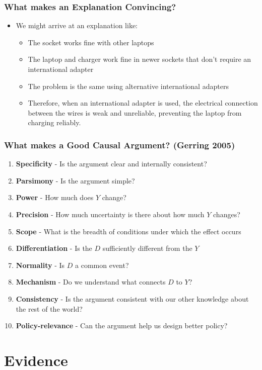 \documentclass[xcolor=x11names,compress]{beamer}\usepackage[]{graphicx}\usepackage[]{xcolor}
\renewcommand{\(}{\begin{columns}}
\renewcommand{\)}{\end{columns}}
\newcommand{\<}[1]{\begin{column}{#1}}
\renewcommand{\>}{\end{column}}
\begin{document}
\begin{frame}
\frametitle{What makes an Explanation Convincing?}
\begin{itemize}
\item We might arrive at an explanation like:
\begin{itemize}
\item The socket works fine with other laptops
\item The laptop and charger work fine in newer sockets that don't require an international adapter
\item The problem is the same using alternative international adapters
\item Therefore, when an international adapter is used, the electrical connection between the wires is weak and unreliable, preventing the laptop from charging reliably. 
\end{itemize}
\end{itemize}
\end{frame}

\begin{frame}
\frametitle{What makes a Good Causal Argument? (Gerring 2005)}
\begin{enumerate}
\item \textbf{Specificity} - Is the argument clear and internally consistent?
\pause
\item \textbf{Parsimony} - Is the argument simple?
\pause
\item \textbf{Power} - How much does $Y$ change?
\pause
\item \textbf{Precision} - How much uncertainty is there about how much $Y$ changes?
\pause
\item \textbf{Scope} - What is the breadth of conditions under which the effect occurs
\pause
\item \textbf{Differentiation} - Is the $D$ sufficiently different from the $Y$
\pause
\item \textbf{Normality} - Is $D$ a common event?
\pause
\item \textbf{Mechanism} - Do we understand what connects $D$ to $Y$?
\pause
\item \textbf{Consistency} - Is the argument consistent with our other knowledge about the rest of the world?
\pause
\item \textbf{Policy-relevance} - Can the argument help us design better policy?
\end{enumerate}
\end{frame}

\section{Evidence}
\end{document}
